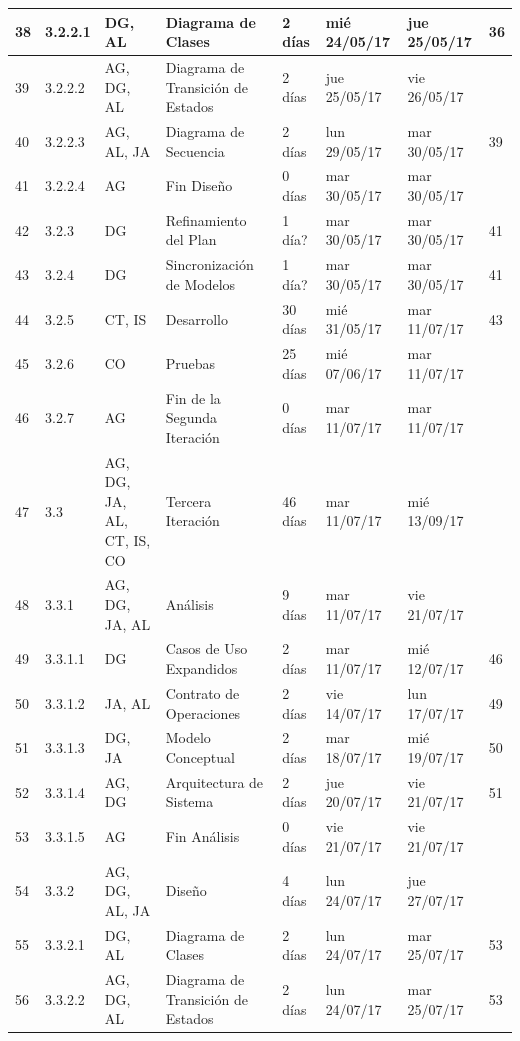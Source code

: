 \begin{center}
\begin{longtable}{  p{0.5cm}  p{1cm}  p{2cm}  p{4cm}  p{1.5cm}  p{2cm}  p{2cm}  p{2cm}  }
38	&	3.2.2.1	&	DG, AL	&	         Diagrama de Clases	&	2 días	&	mié 24/05/17	&	jue 25/05/17	&	36	\\ \hline
39	&	3.2.2.2	&	AG, DG, AL	&	         Diagrama de Transición de Estados	&	2 días	&	jue 25/05/17	&	vie 26/05/17	&		\\ \hline
40	&	3.2.2.3	&	AG, AL, JA	&	         Diagrama de Secuencia	&	2 días	&	lun 29/05/17	&	mar 30/05/17	&	39	\\ \hline
41	&	3.2.2.4	&	AG	&	         Fin Diseño	&	0 días	&	mar 30/05/17	&	mar 30/05/17	&		\\ \hline
42	&	3.2.3	&	DG	&	      Refinamiento del Plan	&	1 día?	&	mar 30/05/17	&	mar 30/05/17	&	41	\\ \hline
43	&	3.2.4	&	DG	&	      Sincronización de Modelos	&	1 día?	&	mar 30/05/17	&	mar 30/05/17	&	41	\\ \hline
44	&	3.2.5	&	CT, IS	&	      Desarrollo	&	30 días	&	mié 31/05/17	&	mar 11/07/17	&	43	\\ \hline
45	&	3.2.6	&	CO	&	      Pruebas	&	25 días	&	mié 07/06/17	&	mar 11/07/17	&		\\ \hline
46	&	3.2.7	&	AG	&	      Fin de la Segunda Iteración	&	0 días	&	mar 11/07/17	&	mar 11/07/17	&		\\ \hline
47	&	3.3	&	AG, DG, JA, AL, CT, IS, CO	&	   Tercera Iteración	&	46 días	&	mar 11/07/17	&	mié 13/09/17	&		\\ \hline
48	&	3.3.1	&	AG, DG, JA, AL	&	      Análisis	&	9 días	&	mar 11/07/17	&	vie 21/07/17	&		\\ \hline
49	&	3.3.1.1	&	DG	&	         Casos de Uso Expandidos	&	2 días	&	mar 11/07/17	&	mié 12/07/17	&	46	\\ \hline
50	&	3.3.1.2	&	JA, AL	&	         Contrato de Operaciones	&	2 días	&	vie 14/07/17	&	lun 17/07/17	&	49	\\ \hline
51	&	3.3.1.3	&	DG, JA	&	         Modelo Conceptual	&	2 días	&	mar 18/07/17	&	mié 19/07/17	&	50	\\ \hline
52	&	3.3.1.4	&	AG, DG	&	         Arquitectura de Sistema	&	2 días	&	jue 20/07/17	&	vie 21/07/17	&	51	\\ \hline
53	&	3.3.1.5	&	AG	&	         Fin Análisis	&	0 días	&	vie 21/07/17	&	vie 21/07/17	&		\\ \hline
54	&	3.3.2	&	AG, DG, AL, JA	&	      Diseño	&	4 días	&	lun 24/07/17	&	jue 27/07/17	&		\\ \hline
55	&	3.3.2.1	&	DG, AL	&	         Diagrama de Clases	&	2 días	&	lun 24/07/17	&	mar 25/07/17	&	53	\\ \hline
56	&	3.3.2.2	&	AG, DG, AL	&	         Diagrama de Transición de Estados	&	2 días	&	lun 24/07/17	&	mar 25/07/17	&	53	\\ \hline

\end{longtable}
\end{center}
